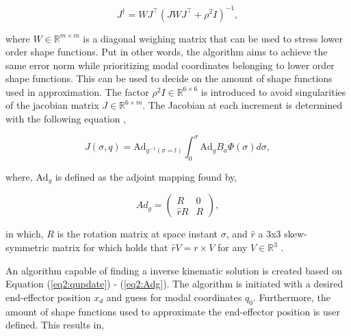 \begin{equation}
    J^\dagger = WJ^\top(JWJ^\top + \rho^2 I)^{-1}
    \label{eq2:pseudoinverse},
\end{equation}

where $W \in \mathbb{R}^{m\times m}$ is a diagonal weighing matrix that can be used to stress lower order shape functions. Put in other words, the algorithm aims to achieve the same error norm while prioritizing modal coordinates belonging to lower order shape functions. This can be used to decide on the amount of shape functions used in approximation. The factor $\rho^2 I \in \mathbb{R}^{6 \times 6}$ is introduced to avoid singularities of the jacobian matrix $J \in \mathbb{R}^{6 \times m}$. The Jacobian at each increment is determined with the following equation \cite{Caasenbrood2020},

\begin{equation}
J(\sigma,q)= \text{Ad}_{g^{-1}(\sigma = l)} \int_{0}^{\sigma} \text{Ad}_g B_a \Phi(\sigma) d\sigma ,
\label{eq2:J}
\end{equation}

where, $\text{Ad}_g$ is defined as the adjoint mapping found by,


\begin{equation}
    Ad_g = \begin{pmatrix} R & 0 \\ \hat{r}R & R \end{pmatrix},
    \label{eq2:Adg}
\end{equation}

in which, $R$ is the rotation matrix at space instant $\sigma$, and $\hat{r}$ a 3x3 skew-symmetric matrix for which holds that $\hat{r}V = r \times V$ for any $V \in \mathbb{R}^3$ \cite{Boyer2019}.

An algorithm capable of finding a inverse kinematic solution is created based on Equation (\ref{eq2:qupdate}) - (\ref{eq2:Adg}). The algorithm is initiated with a desired end-effector position $x_d$ and guess for modal coordinates $q_0$. Furthermore, the amount of shape functions used to approximate the end-effector position is user defined. This results in,


